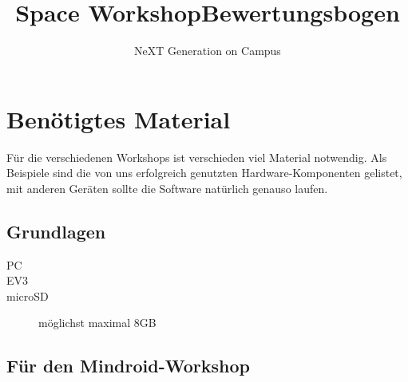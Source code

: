 \documentclass[
	ngerman,
	accentcolor=1c,%
	]{tudapub}
\begin{document}




\title{Space Workshop\newline Bewertungsbogen}
\subtitle{NeXT Generation on Campus}
\date{}





\maketitle


\newpage


\tableofcontents

\section{Ben\"otigtes Material}
F\"ur die verschiedenen Workshops ist verschieden viel Material notwendig. Als Beispiele sind die von uns erfolgreich genutzten Hardware-Komponenten gelistet, mit anderen Ger\"aten sollte die Software nat\"urlich genauso laufen.
\subsection{Grundlagen}
\begin{description}
	\item[PC]
	\item[EV3]
	\item[microSD] m\"oglichst maximal 8GB
\end{description}

\subsection{F\"ur den Mindroid-Workshop}
\end{document}

